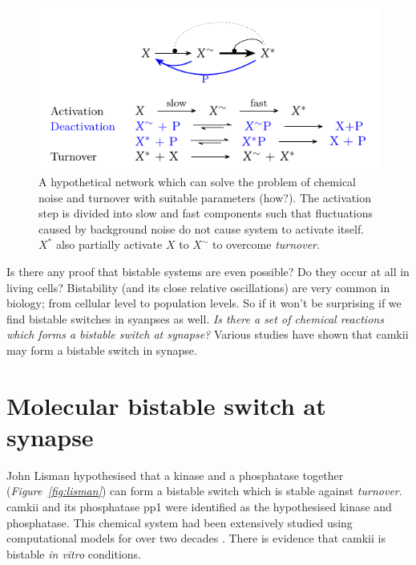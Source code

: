 \documentclass[]{resonance}
\newcommand\Fig[1]{\textit{Figure~\ref{#1}}}
\begin{document}
\begin{figure}[t!]
\centering
\includegraphics[width=\linewidth]{./fig_model_b.pdf}
\caption{A hypothetical network which can solve the problem of chemical noise and
    turnover with suitable parameters (how?). The activation step is divided into slow and fast
    components such that fluctuations caused by background noise do not cause system to 
    activate itself. $X^*$ also partially activate $X$ to $X^\sim$ to overcome \textit{turnover}. 
}\label{fig:model_bistable}
\end{figure}

Is there any  proof that bistable systems are even possible? Do they occur at
all in living cells?  Bistability (and its close relative oscillations) are very
common in biology; from cellular level to population levels. So if it won't be
surprising if we find bistable switches in syanpses as well.  \emph{Is there a set
of chemical reactions which forms a bistable switch at synapse?} Various studies
have shown that \gls{camkii} may form a bistable switch in synapse.

\section{Molecular bistable switch at synapse}\label{sec:molecular_switch}


John Lisman hypothesised that a kinase and a phosphatase together
(\Fig{fig:lisman}) can form a bistable switch which is stable against
\emph{turnover}. \gls{camkii} and its phosphatase \gls{pp1} were identified as
the hypothesised kinase and phosphatase. This chemical system had been
extensively studied using computational models for over two decades
\cite{sandstorm}. There is evidence that \gls{camkii} is bistable \emph{in
vitro} conditions. 
\end{document}
